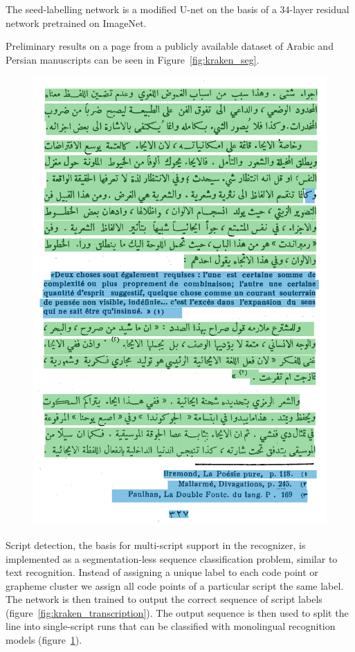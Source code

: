 The seed-labelling network is a modified U-net \cite{ronneberger2015u} on the
basis of a 34-layer residual network \cite{he2016deep} pretrained on ImageNet.

Preliminary results on a page from a publicly available dataset of Arabic and
Persian manuscripts \cite{kiessling2019badam} can be seen in
Figure~\ref{fig:kraken_seg}.

\begin{figure}[h!tp]
	\includegraphics[width=0.8\linewidth]{high.png}
	\centering
	\label{fig:kraken_script}
\end{figure}

Script detection, the basis for multi-script support in the recognizer, is
implemented as a segmentation-less sequence classification problem, similar to
text recognition. Instead of assigning a unique label to each code point or
grapheme cluster we assign all code points of a particular script the same
label. The network is then trained to output the correct sequence of script
labels (figure~\ref{fig:kraken_transcription}). The output sequence is then
used to split the line into single-script runs that can be classified with
monolingual recognition models (figure~\ref{fig:kraken_script}).

